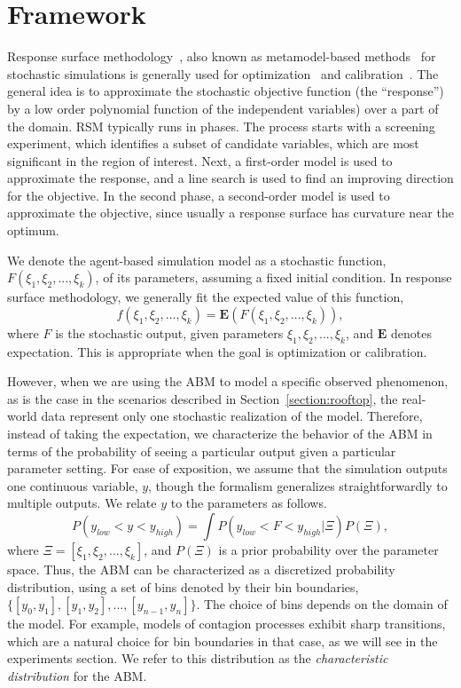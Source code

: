 \section{Framework}
\label{sec:framework}

Response surface methodology~\cite{box51response,carley04response}, also known as metamodel-based methods~\cite{barton06metamodel} for stochastic simulations is generally used for optimization~\cite{neddermeijer00response} and calibration~\cite{fadikar17emulation, lamperti18calibration}.
The general idea is to approximate the stochastic objective function (the ``response'') by a low order polynomial function
of the independent variables) over a part of the domain.
RSM typically runs in phases. The process starts with a screening experiment, which identifies a subset of
candidate variables, which are most significant in the region of interest.
Next, a first-order model is used to approximate the response, and a line search is used to 
find an improving direction for the objective.
In the second phase, a second-order model is used to approximate the objective, since
usually a response surface has curvature near the optimum.


We denote the agent-based simulation model as a stochastic function, $F(\xi_1, \xi_2, ..., \xi_k)$, of its parameters, assuming a fixed initial condition. In response surface methodology, we generally fit the expected value of this function,
\begin{equation}
f(\xi_1, \xi_2, ..., \xi_k) = \mathbf{E}(F(\xi_1, \xi_2, ..., \xi_k)),
\end{equation}
where $F$ is the stochastic output, given parameters $\xi_1, \xi_2, ..., \xi_k$, and $\mathbf{E}$ denotes expectation. This is appropriate when the goal is optimization or calibration.

However, when we are using the ABM to model a specific observed phenomenon, as is the case in the scenarios described in Section~\ref{section:rooftop}, the real-world data represent only one stochastic realization of the model.
Therefore, instead of taking the expectation, we characterize the behavior of the ABM in terms of the probability of seeing a particular output given a particular
parameter setting. For ease of exposition, we assume that the simulation outputs one continuous variable, $y$, though the
formalism generalizes straightforwardly to multiple outputs. We relate $y$ to the parameters as follows.
\begin{equation}
P(y_{low} < y < y_{high}) = \int P(y_{low} < F < y_{high}|\Xi)P(\Xi),
\label{eqn:output_probability}
\end{equation}
where $\Xi = [\xi_1, \xi_2, ..., \xi_k]$, and $P(\Xi)$ is a prior probability over the parameter space. Thus, the ABM can be
characterized as a discretized probability distribution, using a set of bins denoted by their bin boundaries, $\{[y_0,y_1], [y_1,y_2], ..., [y_{n-1}, y_n]\}$.
The choice of bins depends on the domain of the model. For example, models of contagion processes exhibit sharp
transitions, which are a natural choice for bin boundaries in that case, as we will see in the experiments section. We
refer to this distribution as the \emph{characteristic distribution} for the ABM.

